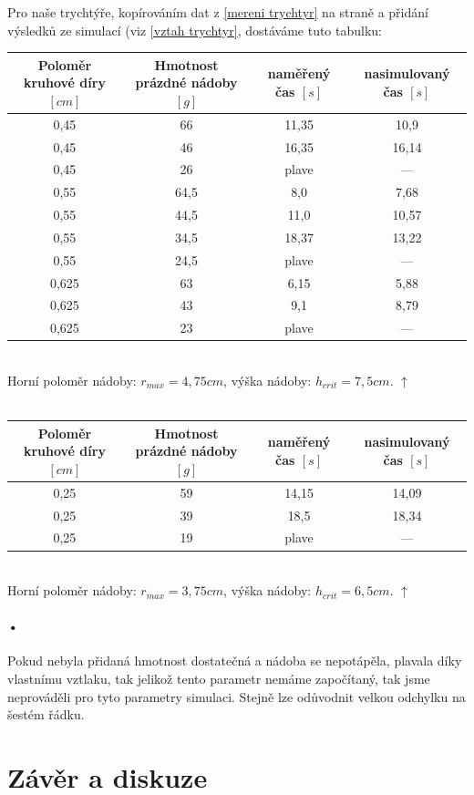 \documentclass[14pt,a4paper]{article}
\begin{document}
Pro naše trychtýře, kopírováním dat z \ref{mereni trychtyr} na straně \pageref{mereni trychtyr} a přidání výsledků ze simulací (viz \ref{vztah trychtyr}, dostáváme tuto tabulku:\\
\begin{tabular}{|c|c||c|c||}
\hline 
Poloměr kruhové díry$[cm]$&Hmotnost prázdné nádoby$[g]$&naměřený čas $[s]$&nasimulovaný čas $[s]$\\ 
\hline 
\hline 
0,45 & 66 & 11,35 & 10,9\\ 
\hline 
0,45 & 46 & 16,35 & 16,14\\ 
\hline 
0,45 & 26 & plave & ---\\ 
\hline 
0,55 & 64,5 & 8,0 & 7,68\\ 
\hline 
0,55 & 44,5 & 11,0 & 10,57\\ 
\hline 
0,55 & 34,5 & 18,37 & 13,22\\ 
\hline 
0,55 & 24,5 & plave & ---\\ 
\hline 
0,625 & 63 & 6,15 & 5,88\\ 
\hline 
0,625 & 43 & 9,1& 8,79\\ 
\hline 
0,625 & 23 & plave& ---\\ 
\hline 
\end{tabular}
\\Horní poloměr nádoby: $r_{max}=4,75cm$, výška nádoby: $h_{crit}=7,5cm$. $\uparrow$ \\\\
\begin{tabular}{|c|c||c|c||}
\hline 
Poloměr kruhové díry$[cm]$&Hmotnost prázdné nádoby$[g]$&naměřený čas $[s]$&nasimulovaný čas $[s]$\\ 
\hline 
\hline 
0,25 & 59 & 14,15 & 14,09\\ 
\hline 
0,25 & 39 & 18,5 & 18,34\\ 
\hline 
0,25 & 19 & plave & ---\\ 
\hline 
\end{tabular}
\\Horní poloměr nádoby: $r_{max}=3,75cm$, výška nádoby: $h_{crit}=6,5cm$. $\uparrow$
\paragraph{•}Pokud nebyla přidaná hmotnost dostatečná a nádoba se nepotápěla, plavala díky vlastnímu vztlaku, tak jelikož tento parametr nemáme započítaný, tak jsme neprováděli pro tyto parametry simulaci. Stejně lze odůvodnit velkou odchylku na šestém řádku.
\newpage
\section{Závěr a diskuze}
\end{document}
